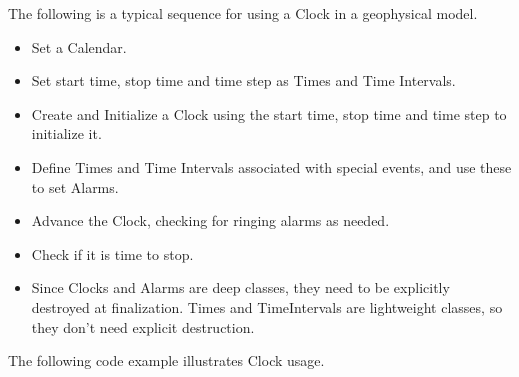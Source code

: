 
The following is a typical sequence for using a Clock in a 
geophysical model.

\begin{itemize}
\item Set a Calendar.
\item Set start time, stop time and time step as Times and 
Time Intervals.
\item Create and Initialize a Clock using the start time, stop time and time
step to initialize it.
\item Define Times and Time Intervals associated with special
events, and use these to set Alarms.
\end{itemize}

\begin{itemize}
\item Advance the Clock, checking for ringing alarms as needed.
\item Check if it is time to stop.
\end{itemize}

\begin{itemize}
\item Since Clocks and Alarms are deep classes, they need to be explicitly
destroyed at finalization.  Times and TimeIntervals are lightweight classes,
so they don't need explicit destruction.
\end{itemize}

The following code example illustrates Clock usage.

